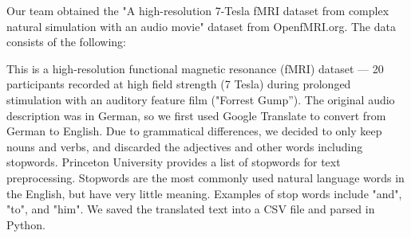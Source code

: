 \par \indent 

Our team obtained the "A high-resolution 7-Tesla fMRI dataset from complex natural 
simulation with an audio movie" dataset from OpenfMRI.org. The data consists of the 
following: 

This is a high-resolution functional magnetic resonance (fMRI) dataset — 20 participants recorded at high field strength (7 Tesla) during prolonged stimulation with an auditory feature film ("Forrest Gump''). The original audio description was in German, so we first used Google Translate 
 to convert from German to English. Due to grammatical differences, we decided to
 only keep nouns and verbs, and discarded the adjectives and other words including
 stopwords. Princeton University provides a list of stopwords for text preprocessing.
 Stopwords are the most commonly used natural language words in the English, but have 
 very little meaning. Examples of stop words include "and", "to", and "him". We saved 
 the translated text into a CSV file and parsed in Python. 
